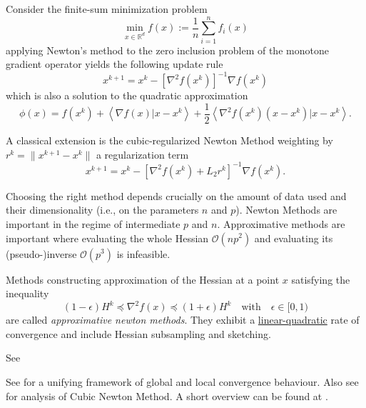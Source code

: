 \documentclass{article}
\newcommand{\innerp}[2]{\left\langle #1 \vert #2 \right\rangle}
\begin{document}
\begin{definition}[label=h9xvj58r, name=Newton Method]
	Consider the finite-sum minimization problem 
	\[
		\min_{x\in\mathbb R^d}f(x):=\frac{1}{n}\sum_{i=1}^{n}f_i(x)
	\]
	applying Newton's method to the zero inclusion problem of the monotone gradient operator yields the following update rule
	\[
		x^{k+1}=x^k - [\nabla^2 f(x^k)]^{-1}\nabla f(x^k)
	\]
	which is also a solution to the quadratic approximation
	\[
		\phi(x) = f(x^k) + \innerp{\nabla f(x)}{x-x^k}+\frac{1}{2}\innerp{\nabla^2 f(x^k)(x-x^k)}{x-x^k}.
	\]

	A classical extension is the cubic-regularized Newton Method weighting by \( r^k = \lVert x^{k+1} - x^k\rVert \) a regularization term
	\[
		x^{k+1}=x^k - [\nabla^2 f(x^k) + L_2r^k]^{-1}\nabla f(x^k).
	\]

	Choosing the right method depends crucially on the amount of data used and their dimensionality (i.e., on the parameters \(n\) and \(p\)). Newton Methods are important in the regime of intermediate \( p \) and \( n \). Approximative methods are important where evaluating the whole Hessian \( \mathcal O(np^2) \) and evaluating its (pseudo-)inverse \( \mathcal O(p^3) \) is infeasible.

	\begin{definition}[label=pd12rq4h, name=Approximate Newton Methods]
		Methods constructing approximation of the Hessian at a point \( x \) satisfying the inequality
		\[
			(1-\epsilon)H^k \preceq \nabla^2 f(x) \preceq (1+\epsilon)H^k \quad \text{with}\quad\epsilon\in[0,1)
		\]
		are called \emph{approximative newton methods}. They exhibit a \hyperref[v_o4l6wn]{linear-quadratic} rate of convergence and include Hessian subsampling and sketching.
		\begin{example}[label=vx9hm059, name=NewSamp]
			See \cite{newsamp}
		\end{example}

		\begin{literature}[label=zcwoa_s7, name=Unified Analysis Framework]
			See \cite{approximate_newton_method} for a unifying framework of global and local convergence behaviour. Also see \cite{unified_convergence_cubic_newton} for analysis of Cubic Newton Method. A short overview can be found at \cite{approximate_newton_liu}.
		\end{literature}
	\end{definition}
\end{definition}
\end{document}
